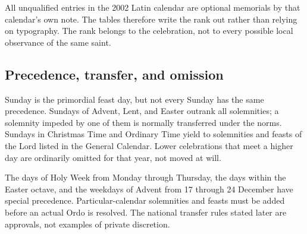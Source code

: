 All unqualified entries in the 2002 Latin calendar are optional memorials by that calendar's own note. The tables therefore write the rank out rather than relying on typography. The rank belongs to the celebration, not to every possible local observance of the same saint.

\subsection{Precedence, transfer, and omission}

Sunday is the primordial feast day, but not every Sunday has the same precedence. Sundays of Advent, Lent, and Easter outrank all solemnities; a solemnity impeded by one of them is normally transferred under the norms. Sundays in Christmas Time and Ordinary Time yield to solemnities and feasts of the Lord listed in the General Calendar. Lower celebrations that meet a higher day are ordinarily omitted for that year, not moved at will.

The days of Holy Week from Monday through Thursday, the days within the Easter octave, and the weekdays of Advent from 17 through 24 December have special precedence. Particular-calendar solemnities and feasts must be added before an actual Ordo is resolved. The national transfer rules stated later are approvals, not examples of private discretion.

